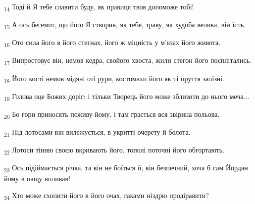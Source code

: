 \begin{tcolorbox}
\textsubscript{14} Тоді й Я тебе славити буду, як правиця твоя допоможе тобі!
\end{tcolorbox}
\begin{tcolorbox}
\textsubscript{15} А ось бегемот, що його Я створив, як тебе, траву, як худоба велика, він їсть.
\end{tcolorbox}
\begin{tcolorbox}
\textsubscript{16} Ото сила його в його стегнах, його ж міцність у м'язах його живота.
\end{tcolorbox}
\begin{tcolorbox}
\textsubscript{17} Випростовує він, немов кедра, свойого хвоста, жили стегон його посплітались.
\end{tcolorbox}
\begin{tcolorbox}
\textsubscript{18} Його кості немов мідяні оті рури, костомахи його як ті пруття залізні.
\end{tcolorbox}
\begin{tcolorbox}
\textsubscript{19} Голова оце Божих доріг; і тільки Творець його може зблизити до нього меча...
\end{tcolorbox}
\begin{tcolorbox}
\textsubscript{20} Бо гори приносять поживу йому, і там грається вся звірина польова.
\end{tcolorbox}
\begin{tcolorbox}
\textsubscript{21} Під лотосами він вилежується, в укритті очерету й болота.
\end{tcolorbox}
\begin{tcolorbox}
\textsubscript{22} Лотоси тінню своєю вкривають його, тополі поточні його обгортають.
\end{tcolorbox}
\begin{tcolorbox}
\textsubscript{23} Ось підіймається річка, та він не боїться її, він безпечний, хоча б сам Йордан йому в пащу впливав!
\end{tcolorbox}
\begin{tcolorbox}
\textsubscript{24} Хто може схопити його в його очах, гаками ніздрю продіравити?
\end{tcolorbox}

